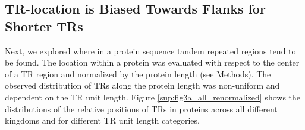 \documentclass[a4,center,fleqn]{NAR}
\begin{document}
%

\subsection{TR-location is Biased Towards Flanks for Shorter TRs}
Next, we explored where in a protein sequence tandem repeated regions tend to be found. The location within a protein was evaluated with respect to the center of a TR region and normalized by the protein length (see Methods).  
The observed distribution of TRs along the protein length was non-uniform and dependent on the TR unit length. Figure \ref{sup:fig3a_all_renormalized} shows the distributions of the relative positions of TRs in proteins across all different kingdoms and for different TR unit length categories.
\end{document}
